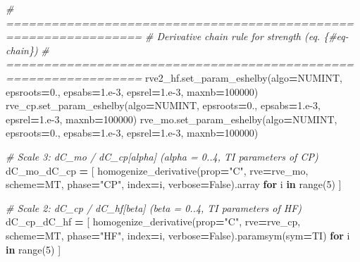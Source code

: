 \documentclass[
  a4paper,
  numbers=noendperiod,
  DIV=12]{scrreprt}
\newenvironment{Shaded}{\begin{snugshade}}{\end{snugshade}}
\newcommand{\BuiltInTok}[1]{#1}
\newcommand{\CommentTok}[1]{\textcolor[rgb]{0.56,0.35,0.01}{\textit{#1}}}
\newcommand{\ControlFlowTok}[1]{\textcolor[rgb]{0.13,0.29,0.53}{\textbf{#1}}}
\newcommand{\DecValTok}[1]{\textcolor[rgb]{0.00,0.00,0.81}{#1}}
\newcommand{\FloatTok}[1]{\textcolor[rgb]{0.00,0.00,0.81}{#1}}
\newcommand{\KeywordTok}[1]{\textcolor[rgb]{0.13,0.29,0.53}{\textbf{#1}}}
\newcommand{\NormalTok}[1]{#1}
\newcommand{\OperatorTok}[1]{\textcolor[rgb]{0.81,0.36,0.00}{\textbf{#1}}}
\newcommand{\StringTok}[1]{\textcolor[rgb]{0.31,0.60,0.02}{#1}}
\newcommand{\VariableTok}[1]{\textcolor[rgb]{0.00,0.00,0.00}{#1}}
\begin{document}
\begin{Shaded}
\begin{Highlighting}[]
    \CommentTok{\# ================================================================}
    \CommentTok{\# Derivative chain rule for strength (eq. \{\#eq{-}chain\})}
    \CommentTok{\# ================================================================}
\NormalTok{    rve2\_hf.set\_param\_eshelby(algo}\OperatorTok{=}\NormalTok{NUMINT, epsroots}\OperatorTok{=}\FloatTok{0.}\NormalTok{,}
\NormalTok{                               epsabs}\OperatorTok{=}\FloatTok{1.e{-}3}\NormalTok{, epsrel}\OperatorTok{=}\FloatTok{1.e{-}3}\NormalTok{, maxnb}\OperatorTok{=}\DecValTok{100000}\NormalTok{)}
\NormalTok{    rve\_cp.set\_param\_eshelby(algo}\OperatorTok{=}\NormalTok{NUMINT, epsroots}\OperatorTok{=}\FloatTok{0.}\NormalTok{,}
\NormalTok{                              epsabs}\OperatorTok{=}\FloatTok{1.e{-}3}\NormalTok{, epsrel}\OperatorTok{=}\FloatTok{1.e{-}3}\NormalTok{, maxnb}\OperatorTok{=}\DecValTok{100000}\NormalTok{)}
\NormalTok{    rve\_mo.set\_param\_eshelby(algo}\OperatorTok{=}\NormalTok{NUMINT, epsroots}\OperatorTok{=}\FloatTok{0.}\NormalTok{,}
\NormalTok{                              epsabs}\OperatorTok{=}\FloatTok{1.e{-}3}\NormalTok{, epsrel}\OperatorTok{=}\FloatTok{1.e{-}3}\NormalTok{, maxnb}\OperatorTok{=}\DecValTok{100000}\NormalTok{)}

    \CommentTok{\# Scale 3: dC\_mo / dC\_cp[alpha]  (alpha = 0..4, TI parameters of CP)}
\NormalTok{    dC\_mo\_dC\_cp }\OperatorTok{=}\NormalTok{ [}
\NormalTok{        homogenize\_derivative(prop}\OperatorTok{=}\StringTok{"C"}\NormalTok{, rve}\OperatorTok{=}\NormalTok{rve\_mo, scheme}\OperatorTok{=}\NormalTok{MT,}
\NormalTok{                               phase}\OperatorTok{=}\StringTok{"CP"}\NormalTok{, index}\OperatorTok{=}\NormalTok{i, verbose}\OperatorTok{=}\VariableTok{False}\NormalTok{).array}
        \ControlFlowTok{for}\NormalTok{ i }\KeywordTok{in} \BuiltInTok{range}\NormalTok{(}\DecValTok{5}\NormalTok{)}
\NormalTok{    ]}

    \CommentTok{\# Scale 2: dC\_cp / dC\_hf[beta]  (beta = 0..4, TI parameters of HF)}
\NormalTok{    dC\_cp\_dC\_hf }\OperatorTok{=}\NormalTok{ [}
\NormalTok{        homogenize\_derivative(prop}\OperatorTok{=}\StringTok{"C"}\NormalTok{, rve}\OperatorTok{=}\NormalTok{rve\_cp, scheme}\OperatorTok{=}\NormalTok{MT,}
\NormalTok{                               phase}\OperatorTok{=}\StringTok{"HF"}\NormalTok{, index}\OperatorTok{=}\NormalTok{i, verbose}\OperatorTok{=}\VariableTok{False}\NormalTok{).paramsym(sym}\OperatorTok{=}\NormalTok{TI)}
        \ControlFlowTok{for}\NormalTok{ i }\KeywordTok{in} \BuiltInTok{range}\NormalTok{(}\DecValTok{5}\NormalTok{)}
\NormalTok{    ]}


\end{Highlighting}
\end{Shaded}
\end{document}
